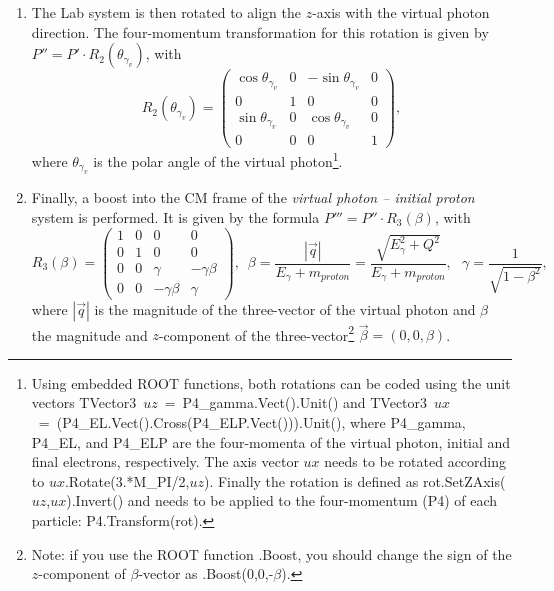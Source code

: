 \begin{enumerate}
\item The Lab system is then rotated to align the $z$-axis with the virtual photon direction. The four-momentum transformation for this rotation is given by $P'' = P' \cdot R_2 (\theta_{\gamma_{v}})$, with 
\begin{equation}
R_{2}(\theta_{\gamma_{v}})=\begin{pmatrix}
\cos\theta_{\gamma_{v}} &0  &-\sin\theta_{\gamma_{v}}  &0 \\ 
 0& 1 & 0 &0 \\ 
 \sin\theta_{\gamma_{v}} &0  &\cos\theta_{\gamma_{v}}  & 0\\ 
0 &0  & 0 &1 
\end{pmatrix},
\end{equation}
where $\theta_{\gamma_v}$ is the polar angle of the virtual photon\footnote[2]{Using embedded ROOT functions, both rotations can be coded using the unit vectors TVector3~$uz$~=~P4\_gamma.Vect().Unit() and 
 TVector3~$ux$~=~(P4\_EL.Vect().Cross(P4\_ELP.Vect())).Unit(), where P4\_gamma, P4\_EL, and P4\_ELP are the four-momenta of the virtual photon, initial and final electrons, respectively. 
 The axis vector $ux$ needs to be rotated according to $ux$.Rotate(3.*M\_PI/2,$uz$).
Finally the rotation is defined as rot.SetZAxis($uz$,$ux$).Invert() and needs to be applied to the four-momentum (P4) of each particle:
 P4.Transform(rot).}.

\item Finally, a boost into the CM frame of the {\em virtual photon -- initial proton} system is performed. It is given by the formula $P''' = P'' \cdot R_3(\beta)$, with 
\begin{equation}
R_{3}(\beta) = \begin{pmatrix}
1 &0  &0  &0 \\ 
0 &1  &0  &0 \\ 
 0&  0& \gamma  &-\gamma \beta  \\ 
 0&  0& -\gamma \beta  & \gamma 
\end{pmatrix}, \, \, \, \beta =\frac{|\overrightarrow{q}|}{E_{\gamma }+m_{proton}}=\frac{\sqrt{E^{2}_{\gamma }+Q^{2}}}{E_{\gamma }+m_{proton}}, \, \, \,\,  \gamma =\frac{1}{\sqrt{1-\beta ^{2}}},
\end{equation}
where $|\overrightarrow{q}|$ is the magnitude of the three-vector of the virtual photon and $\beta$ the magnitude and $z$-component of the three-vector\footnote[3]{Note: if you use the ROOT function .Boost, you should change the sign of the $z$-component of $\beta$-vector as .Boost(0,0,-$\beta$).} $\overrightarrow{\beta}=(0,0,\beta)$.
\end{enumerate}

